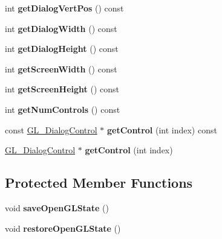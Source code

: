 \begin{DoxyCompactItemize}
\item 
\hypertarget{class_g_l___dialog_window_a0e7abc3b72603ec14e9a444d2950bfb0}{int {\bfseries get\+Dialog\+Vert\+Pos} () const }\label{class_g_l___dialog_window_a0e7abc3b72603ec14e9a444d2950bfb0}

\item 
\hypertarget{class_g_l___dialog_window_a3add2c9acfdfda03bf94dbd4b34029cd}{int {\bfseries get\+Dialog\+Width} () const }\label{class_g_l___dialog_window_a3add2c9acfdfda03bf94dbd4b34029cd}

\item 
\hypertarget{class_g_l___dialog_window_ab1eda43b4eb99224e991d2296c811fb8}{int {\bfseries get\+Dialog\+Height} () const }\label{class_g_l___dialog_window_ab1eda43b4eb99224e991d2296c811fb8}

\item 
\hypertarget{class_g_l___dialog_window_a9f8d89677347b1550ec2b323e4063383}{int {\bfseries get\+Screen\+Width} () const }\label{class_g_l___dialog_window_a9f8d89677347b1550ec2b323e4063383}

\item 
\hypertarget{class_g_l___dialog_window_ac595e982efb4ea1181ca96a7a2abcbb5}{int {\bfseries get\+Screen\+Height} () const }\label{class_g_l___dialog_window_ac595e982efb4ea1181ca96a7a2abcbb5}

\item 
\hypertarget{class_g_l___dialog_window_a7d1dc3bc515abf57a78d77ab14161026}{int {\bfseries get\+Num\+Controls} () const }\label{class_g_l___dialog_window_a7d1dc3bc515abf57a78d77ab14161026}

\item 
\hypertarget{class_g_l___dialog_window_a6518a270be06f132bfeb6aff569a8d2f}{const \hyperlink{class_g_l___dialog_control}{G\+L\+\_\+\+Dialog\+Control} $\ast$ {\bfseries get\+Control} (int index) const }\label{class_g_l___dialog_window_a6518a270be06f132bfeb6aff569a8d2f}

\item 
\hypertarget{class_g_l___dialog_window_a331a43f1b73663ec509b180f9b90df42}{\hyperlink{class_g_l___dialog_control}{G\+L\+\_\+\+Dialog\+Control} $\ast$ {\bfseries get\+Control} (int index)}\label{class_g_l___dialog_window_a331a43f1b73663ec509b180f9b90df42}

\end{DoxyCompactItemize}
\subsection*{Protected Member Functions}
\begin{DoxyCompactItemize}
\item 
\hypertarget{class_g_l___dialog_window_af977c142e912a5706fe45d805827cec7}{void {\bfseries save\+Open\+G\+L\+State} ()}\label{class_g_l___dialog_window_af977c142e912a5706fe45d805827cec7}

\item 
\hypertarget{class_g_l___dialog_window_aca30726d4b12fbf89cb3506cf06a6347}{void {\bfseries restore\+Open\+G\+L\+State} ()}\label{class_g_l___dialog_window_aca30726d4b12fbf89cb3506cf06a6347}

\end{DoxyCompactItemize}


